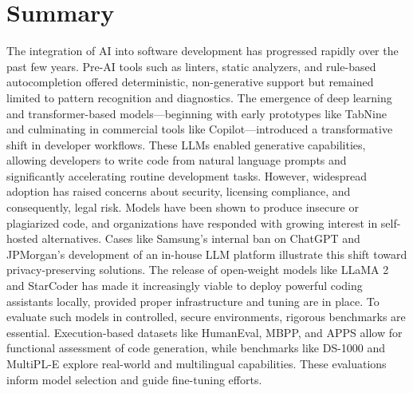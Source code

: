 \section{Summary}
\label{sec:summary}
The integration of AI into software development has progressed rapidly over the past few years. Pre-AI tools such as linters, static analyzers, and rule-based autocompletion offered deterministic, non-generative support but remained limited to pattern recognition and diagnostics. The emergence of deep learning and transformer-based models—beginning with early prototypes like TabNine and culminating in commercial tools like Copilot—introduced a transformative shift in developer workflows. These \glspl{LLM} enabled generative capabilities, allowing developers to write code from natural language prompts and significantly accelerating routine development tasks. However, widespread adoption has raised concerns about security, licensing compliance, and consequently, legal risk. Models have been shown to produce insecure or plagiarized code, and organizations have responded with growing interest in self-hosted alternatives. Cases like Samsung’s internal ban on ChatGPT and JPMorgan’s development of an in-house LLM platform illustrate this shift toward privacy-preserving solutions. The release of open-weight models like LLaMA 2 and StarCoder has made it increasingly viable to deploy powerful coding assistants locally, provided proper infrastructure and tuning are in place. To evaluate such models in controlled, secure environments, rigorous benchmarks are essential. Execution-based datasets like HumanEval, \gls{MBPP}, and \gls{APPS} allow for functional assessment of code generation, while benchmarks like DS-1000  and MultiPL-E explore real-world and multilingual capabilities. These evaluations inform model selection and guide fine-tuning efforts.
